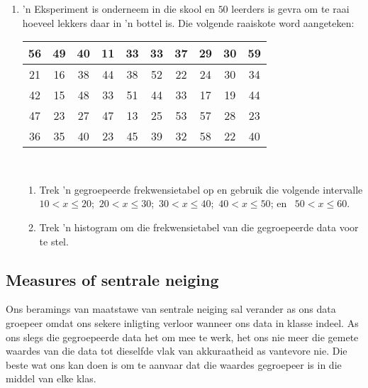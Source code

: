 \begin{exercises}{}{
    \begin{enumerate}[itemsep=5pt, label=\textbf{\arabic*}. ]
    \item ’n Eksperiment is onderneem in die skool en $50$ leerders is gevra om te raai hoeveel lekkers daar in ’n bottel is. Die volgende raaiskote word aangeteken:
      \\
      \begin{center}
        \begin{tabular}{|c|c|c|c|c|c|c|c|c|c|} \hline
          56 & 49 & 40 & 11 & 33 & 33 & 37 & 29 & 30 & 59 \\ \hline
          21 & 16 & 38 & 44 & 38 & 52 & 22 & 24 & 30 & 34 \\\hline
          42 & 15 & 48 & 33 & 51 & 44 & 33 & 17 & 19 & 44 \\\hline
          47 & 23 & 27 & 47 & 13 & 25 & 53 & 57 & 28 & 23 \\\hline
          36 & 35 & 40 & 23 & 45 & 39 & 32 & 58 & 22 & 40 \\\hline
        \end{tabular}
      \end{center}
      \vspace{8pt}\\

      \begin{enumerate}[noitemsep, label=\textbf{(\alph*)} ]
      \item Trek ’n gegroepeerde frekwensietabel op en gebruik die volgende intervalle
        $10 < x \leq 20$;\ $20 < x \leq 30$;\ $30 < x \leq 40$;\ 
        $40 < x \leq 50$; en \ $50 < x \leq 60$.
      \item Trek ’n histogram om die frekwensietabel van die gegroepeerde data voor te stel.
      \end{enumerate}
    \end{enumerate}
}
\end{exercises}
% 
\subsection*{Measures of sentrale neiging}
Ons beramings van maatstawe van sentrale neiging sal verander as ons data groepeer omdat ons sekere inligting verloor wanneer ons data in klasse indeel. As ons slegs die gegroepeerde data het om mee te werk, het ons nie meer die gemete waardes van die data tot dieselfde vlak van akkuraatheid as vantevore nie. Die beste wat ons kan doen is om te aanvaar dat die waardes gegroepeer is in die middel van elke klas.\par

